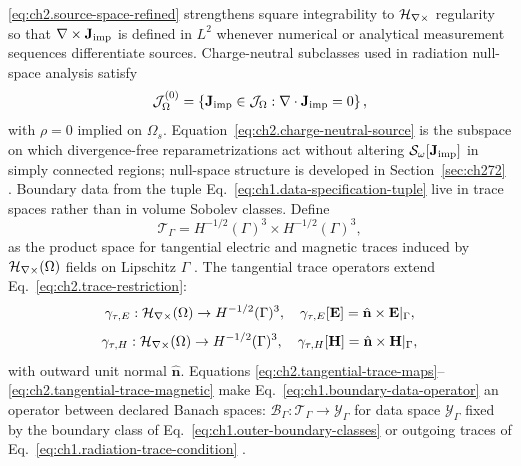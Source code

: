 \eqref{eq:ch2.source-space-refined} strengthens square integrability to
\(\mathcal{H}_{\nabla\times}\) regularity so that \(\nabla\times\mathbf{J}_{\mathrm{imp}}\) is defined in \(L^{2}\) whenever
numerical or analytical measurement sequences differentiate sources. Charge-neutral subclasses
used in radiation null-space analysis satisfy
\begin{equation}
\label{eq:ch2.charge-neutral-source}
\mathcal{J}_\Omega^{(0)}
=
\left\{
\mathbf{J}_{\mathrm{imp}}\in\mathcal{J}_\Omega:
\nabla\cdot\mathbf{J}_{\mathrm{imp}}=0
\right\},
\end{equation}
with \(\rho=0\) implied on \(\Omega_s\). Equation~\eqref{eq:ch2.charge-neutral-source}
is the subspace on which divergence-free reparametrizations act without altering
\(\mathcal{S}_\omega[\mathbf{J}_{\mathrm{imp}}]\) in simply connected regions; null-space structure is
developed in Section~\ref{sec:ch272} \cite{harrington2001}.
Boundary data from the tuple Eq.~\eqref{eq:ch1.data-specification-tuple} live in
trace spaces rather than in volume Sobolev classes. Define
\begin{equation}
\label{eq:ch2.trace-space-definition}
\mathcal{T}_\Gamma
=
H^{-1/2}(\Gamma)^{3}\times H^{-1/2}(\Gamma)^{3},
\end{equation}
as the product space for tangential electric and magnetic traces induced by
\(\mathcal{H}_{\nabla\times}(\Omega)\) fields on Lipschitz \(\Gamma\) \cite{stratton1941}. The
tangential trace operators extend Eq.~\eqref{eq:ch2.trace-restriction}:
\begin{equation}
\label{eq:ch2.tangential-trace-maps}
\gamma_{\tau,E}:\mathcal{H}_{\nabla\times}(\Omega)\to H^{-1/2}(\Gamma)^{3},
\quad
\gamma_{\tau,E}[\mathbf{E}]=\hat{\mathbf{n}}\times\mathbf{E}|_{\Gamma},
\end{equation}
\begin{equation}
\label{eq:ch2.tangential-trace-magnetic}
\gamma_{\tau,H}:\mathcal{H}_{\nabla\times}(\Omega)\to H^{-1/2}(\Gamma)^{3},
\quad
\gamma_{\tau,H}[\mathbf{H}]=\hat{\mathbf{n}}\times\mathbf{H}|_{\Gamma},
\end{equation}
with outward unit normal \(\hat{\mathbf{n}}\). Equations
\eqref{eq:ch2.tangential-trace-maps}--\eqref{eq:ch2.tangential-trace-magnetic}
make Eq.~\eqref{eq:ch1.boundary-data-operator} an operator between declared
Banach spaces: \(\mathcal{B}_\Gamma:\mathcal{T}_\Gamma\to\mathcal{Y}_\Gamma\) for
data space \(\mathcal{Y}_\Gamma\) fixed by the boundary class of
Eq.~\eqref{eq:ch1.outer-boundary-classes} or outgoing traces of
Eq.~\eqref{eq:ch1.radiation-trace-condition} \cite{stratton1941}.
